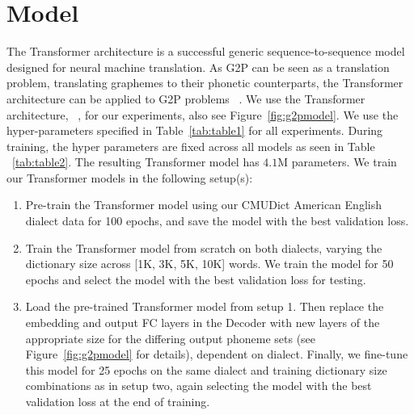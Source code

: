 \section{Model}
The Transformer architecture is a successful generic sequence-to-sequence model designed for neural machine translation. As G2P can be seen as a translation problem, translating graphemes to their phonetic counterparts, the Transformer architecture can be applied to G2P problems ~\cite{yolchuyeva2020transformer,vesik2020model,vesik2020model}. We use the Transformer architecture, ~\cite{Vaswani2017AttentionIA}, for our experiments, also see Figure~\ref{fig:g2pmodel}. We use the hyper-parameters specified in Table~\ref{tab:table1} for all experiments. During training, the hyper parameters are fixed across all models as seen in Table ~\ref{tab:table2}. The resulting Transformer model has $4.1$M parameters.
% 
% 
We train our Transformer models in the following setup(s):
\begin{enumerate}
    \item Pre-train the Transformer model using our CMUDict American English dialect data for 100 epochs, and save the model with the best validation loss.
    \item Train the Transformer model from scratch on both dialects, varying the dictionary size across [1K, 3K, 5K, 10K] words. We train the model for 50 epochs and select the model with the best validation loss for testing.
    \item Load the pre-trained Transformer model from setup 1. Then replace the embedding and output FC layers in the Decoder with new layers of the appropriate size for the differing output phoneme sets (see Figure~\ref{fig:g2pmodel} for details), dependent on dialect.  Finally, we fine-tune this model for 25 epochs on the same dialect and training dictionary size combinations as in setup two, again selecting the model with the best validation loss at the end of training.
\end{enumerate}

